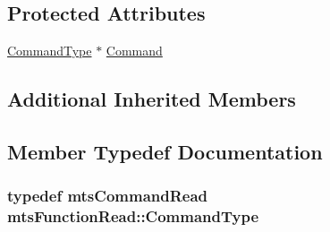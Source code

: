 \subsection*{Protected Attributes}
\begin{DoxyCompactItemize}
\item 
\hyperlink{classmts_function_read_ac29fb3db043f94da5d51fe37860b1015}{Command\-Type} $\ast$ \hyperlink{classmts_function_read_a42b24c58d52e1f0a2aa8bacaebc0f8b3}{Command}
\end{DoxyCompactItemize}
\subsection*{Additional Inherited Members}


\subsection{Member Typedef Documentation}
\hypertarget{classmts_function_read_ac29fb3db043f94da5d51fe37860b1015}{
\subsubsection[{Command\-Type}]{\setlength{\rightskip}{0pt plus 5cm}typedef {\bf mts\-Command\-Read} {\bf mts\-Function\-Read\-::\-Command\-Type}}}\label{classmts_function_read_ac29fb3db043f94da5d51fe37860b1015}


